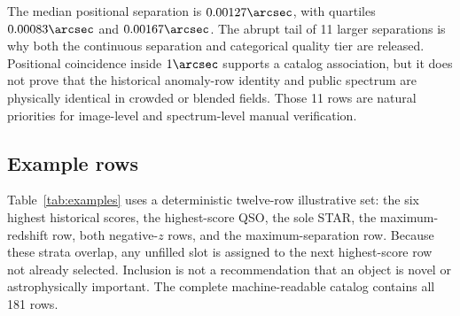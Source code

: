 \documentclass[twocolumn,linenumbers]{aastex702}
\begin{document}
The median positional separation is $0.00127\arcsec$, with quartiles $0.00083\arcsec$ and
$0.00167\arcsec$.  The abrupt tail of 11 larger separations is why both the continuous separation
and categorical quality tier are released.  Positional coincidence inside $1\arcsec$ supports a
catalog association, but it does not prove that the historical anomaly-row identity and public
spectrum are physically identical in crowded or blended fields.  Those 11 rows are natural
priorities for image-level and spectrum-level manual verification.

\subsection{Example rows}\label{sec:examples}

Table~\ref{tab:examples} uses a deterministic twelve-row illustrative set: the six highest
historical scores, the highest-score QSO, the sole STAR, the maximum-redshift row, both negative-$z$
rows, and the maximum-separation row.  Because these strata overlap, any unfilled slot is assigned
to the next highest-score row not already selected.  Inclusion is not a recommendation that an
object is novel or astrophysically important.  The complete machine-readable catalog contains all
181 rows.
\end{document}

